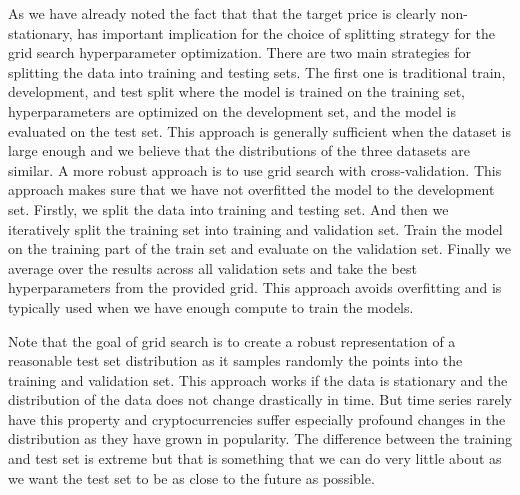 As we have already noted the fact that that the target price is clearly non-stationary,
has important implication for the choice of splitting strategy for the grid search 
hyperparameter optimization. 
There are two main strategies for splitting the data into training and testing sets.
The first one is traditional train, development, and test split where the model is trained on the training set,
hyperparameters are optimized on the development set, and the model is evaluated on the test set.
This approach is generally sufficient when the dataset is large enough and we believe
that the distributions of the three datasets are similar. 
A more robust approach is to use grid search with cross-validation. 
This approach makes sure that we have not overfitted the model to the development set.
Firstly, we split the data into training and testing set. And then 
we iteratively split the training set into training and validation set. 
Train the model on the training part of the train set and evaluate on the validation set.
Finally we average over the results across all validation sets and take the best hyperparameters
from the provided grid. This approach avoids overfitting and is typically
used when we have enough compute to train the models. 


Note that the goal of grid search is to create a robust representation of a 
reasonable test set distribution as it samples randomly the points into the training and validation set.
This approach works if the data is stationary and the distribution of the data does not change drastically in time.
But time series rarely have this property and cryptocurrencies suffer especially profound changes in the distribution
as they have grown in popularity. The difference between the training and test set
is extreme but that is something that we can do very little about as we want the test set
to be as close to the future as possible. 


